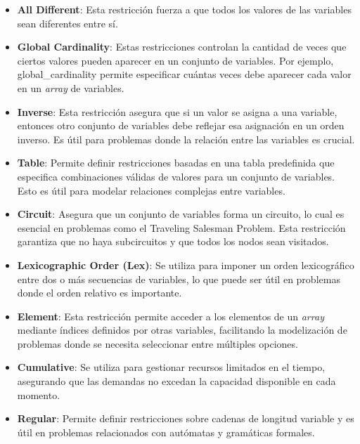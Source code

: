 \documentclass[12pt]{report}
\begin{document}
\begin{itemize}
    \item \textbf{All Different}: Esta restricción fuerza a que todos los valores de las variables sean diferentes entre sí.
    \item \textbf{Global Cardinality}: Estas restricciones controlan la cantidad de veces que ciertos valores pueden aparecer en un conjunto de variables. Por ejemplo, global\_cardinality permite especificar cuántas veces debe aparecer cada valor en un \textit{array} de variables.
    \item \textbf{Inverse}: Esta restricción asegura que si un valor se asigna a una variable, entonces otro conjunto de variables debe reflejar esa asignación en un orden inverso. Es útil para problemas donde la relación entre las variables es crucial.
    \item \textbf{Table}: Permite definir restricciones basadas en una tabla predefinida que especifica combinaciones válidas de valores para un conjunto de variables. Esto es útil para modelar relaciones complejas entre variables.
    \item \textbf{Circuit}: Asegura que un conjunto de variables forma un circuito, lo cual es esencial en problemas como el Traveling Salesman Problem. Esta restricción garantiza que no haya subcircuitos y que todos los nodos sean visitados.
    \item \textbf{Lexicographic Order (Lex)}: Se utiliza para imponer un orden lexicográfico entre dos o más secuencias de variables, lo que puede ser útil en problemas donde el orden relativo es importante.
    \item \textbf{Element}: Esta restricción permite acceder a los elementos de un \textit{array} mediante índices definidos por otras variables, facilitando la modelización de problemas donde se necesita seleccionar entre múltiples opciones.
    \item \textbf{Cumulative}: Se utiliza para gestionar recursos limitados en el tiempo, asegurando que las demandas no excedan la capacidad disponible en cada momento.
    \item \textbf{Regular}: Permite definir restricciones sobre cadenas de longitud variable y es útil en problemas relacionados con autómatas y gramáticas formales.
    
\end{itemize}

\end{document}

